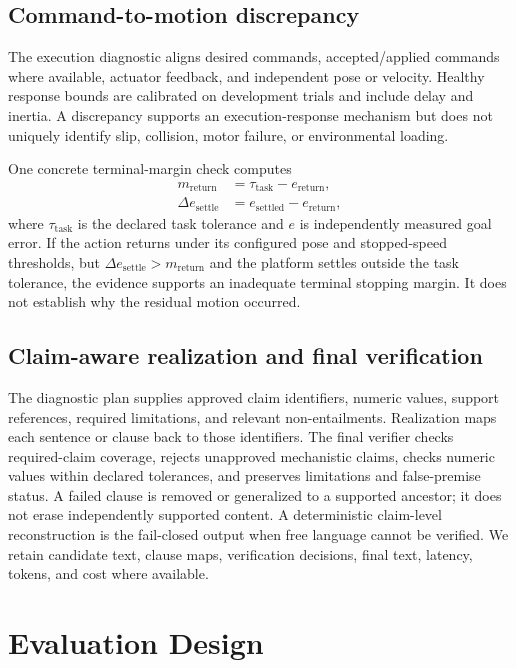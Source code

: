 \documentclass[conference]{IEEEtran}
\begin{document}
\subsection{Command-to-motion discrepancy}

The execution diagnostic aligns desired commands, accepted/applied commands where available,
actuator feedback, and independent pose or velocity. Healthy response bounds are calibrated on
development trials and include delay and inertia. A discrepancy supports an execution-response
mechanism but does not uniquely identify slip, collision, motor failure, or environmental loading.

One concrete terminal-margin check computes
\begin{align*}
m_{\mathrm{return}} &= \tau_{\mathrm{task}} - e_{\mathrm{return}},\\
\Delta e_{\mathrm{settle}} &= e_{\mathrm{settled}} - e_{\mathrm{return}},
\end{align*}
where $\tau_{\mathrm{task}}$ is the declared task tolerance and $e$ is independently measured goal
error. If the action returns under its configured pose and stopped-speed thresholds, but
$\Delta e_{\mathrm{settle}} > m_{\mathrm{return}}$ and the platform settles outside the task
tolerance, the evidence supports an inadequate terminal stopping margin. It does not establish why
the residual motion occurred.

\subsection{Claim-aware realization and final verification}

The diagnostic plan supplies approved claim identifiers, numeric values, support references,
required limitations, and relevant non-entailments. Realization maps each sentence or clause back
to those identifiers. The final verifier checks required-claim coverage, rejects unapproved
mechanistic claims, checks numeric values within declared tolerances, and preserves limitations
and false-premise status. A failed clause is removed or generalized to a supported ancestor; it
does not erase independently supported content. A deterministic claim-level reconstruction is the
fail-closed output when free language cannot be verified. We retain candidate text, clause maps,
verification decisions, final text, latency, tokens, and cost where available.

\section{Evaluation Design}
\end{document}
